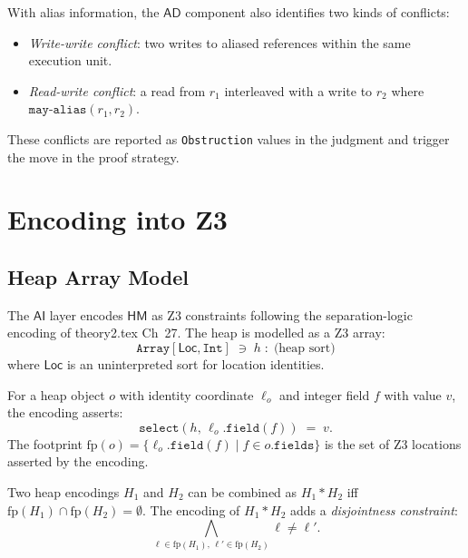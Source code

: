 \documentclass[11pt]{article}
\newcommand{\Loc}{\ell}                     %
\newcommand{\sep}{*}                        %
\newcommand{\fp}{\mathrm{fp}}              %
\newcommand{\MayAlias}{\ensuremath{\mathtt{may\text{-}alias}}}  %
\newcommand{\AD}{\mathsf{AD}}               %
\newcommand{\HM}{\mathsf{HM}}               %
\newcommand{\AI}{\mathsf{AI}}               %
\newcommand{\ArrZ}{\mathtt{Array}}          %
\newcommand{\IntZ}{\mathtt{Int}}            %
\newcommand{\LocSort}{\mathsf{Loc}}         %
\begin{document}
With alias information, the $\AD$ component also identifies two kinds of
conflicts:

\begin{itemize}[noitemsep]
  \item \emph{Write-write conflict}: two writes to aliased references
    within the same execution unit.
  \item \emph{Read-write conflict}: a read from $r_1$ interleaved with a
    write to $r_2$ where $\MayAlias(r_1,r_2)$.
\end{itemize}

These conflicts are reported as \texttt{Obstruction} values in the
judgment and trigger the \ESCALATE{} move in the \JuGeo{} proof
strategy.

\section{Encoding into Z3}
\label{sec:encoding}

\subsection{Heap Array Model}

The $\AI$ layer encodes $\HM$ as Z3 constraints following the
separation-logic encoding of theory2.tex Ch~27.  The heap is modelled
as a Z3 array:
\[
  \ArrZ[\LocSort, \IntZ] \;\ni\;
  h \;:\; \text{(heap sort)}
\]
where $\LocSort$ is an uninterpreted sort for location identities.

\begin{definition}
  \label{def:ptsto-encoding}
  For a heap object $o$ with identity coordinate $\Loc_o$ and integer
  field $f$ with value $v$, the encoding asserts:
  \[
    \mathtt{select}(h,\, \Loc_o.\mathtt{field}(f)) \;=\; v.
  \]
  The footprint $\fp(o) = \{\Loc_o.\mathtt{field}(f) \mid f \in
  o.\mathtt{fields}\}$ is the set of Z3 locations asserted by the
  encoding.
\end{definition}

\begin{definition}
  \label{def:sep-conj}
  Two heap encodings $H_1$ and $H_2$ can be combined as
  $H_1 \sep H_2$ iff $\fp(H_1) \cap \fp(H_2) = \emptyset$.  The
  encoding of $H_1 \sep H_2$ adds a \emph{disjointness constraint}:
  \[
    \bigwedge_{\Loc \in \fp(H_1),\, \Loc' \in \fp(H_2)}
    \Loc \neq \Loc'.
  \]
\end{definition}
\end{document}
